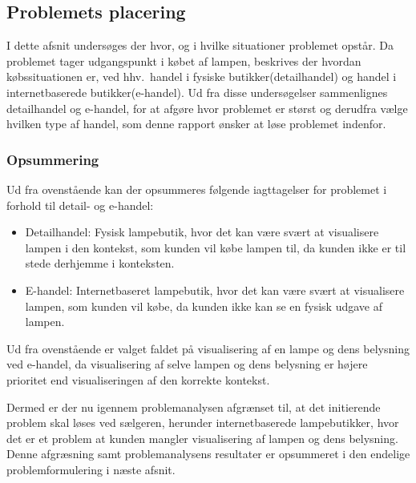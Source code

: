 \subsection{Problemets placering}
I dette afsnit undersøges der hvor, og i hvilke situationer problemet opstår. Da problemet tager udgangspunkt i købet af lampen, beskrives der hvordan købssituationen er, ved hhv.\ handel i fysiske butikker(detailhandel) og handel i internetbaserede butikker(e-handel). Ud fra disse undersøgelser sammenlignes detailhandel og e-handel, for at afgøre hvor problemet er størst og derudfra vælge hvilken type af handel, som denne rapport ønsker at løse problemet indenfor.







\subsubsection*{Opsummering}
Ud fra ovenstående kan der opsummeres følgende iagttagelser for problemet i forhold til detail- og e-handel:
\begin{itemize}
\item Detailhandel: Fysisk lampebutik, hvor det kan være svært at visualisere lampen i den kontekst, som kunden vil købe lampen til, da kunden ikke er til stede derhjemme i konteksten.
\item E-handel: Internetbaseret lampebutik, hvor det kan være svært at visualisere lampen, som kunden vil købe, da kunden ikke kan se en fysisk udgave af lampen.
\end{itemize}
Ud fra ovenstående er valget faldet på visualisering af en lampe og dens belysning ved e-handel, da visualisering af selve lampen og dens belysning er højere prioritet end visualiseringen af den korrekte kontekst.

Dermed er der nu igennem problemanalysen afgrænset til, at det initierende problem skal løses ved sælgeren, herunder internetbaserede lampebutikker, hvor det er et problem at kunden mangler visualisering af lampen og dens belysning. Denne afgræsning samt problemanalysens resultater er opsummeret i den endelige problemformulering i næste afsnit.
